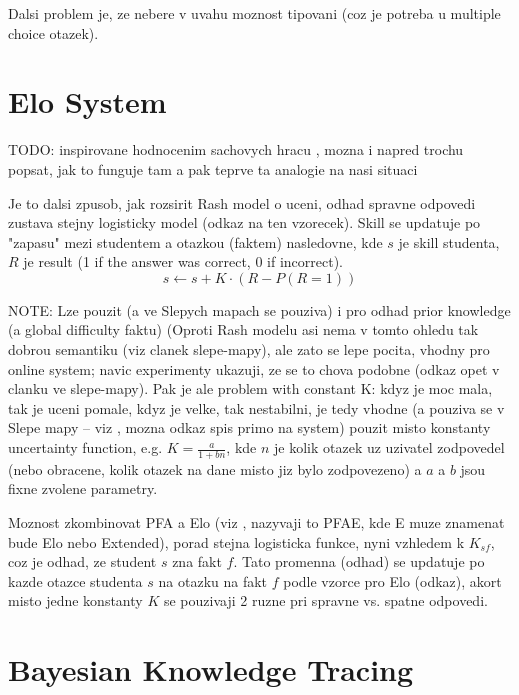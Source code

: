 \documentclass[a4paper, 12pt, twoside]{fithesis2}		%
\renewcommand{\_}{\leavevmode \kern0.0em\vbox{\hrule width0.4em}}
\newcounter{choice}
\begin{document}
Dalsi problem je, ze nebere v uvahu moznost tipovani (coz je potreba u multiple choice otazek).

\section{Elo System}
\label{sec:elo}


TODO: inspirovane hodnocenim sachovych hracu \cite{elo-rating}, mozna i napred trochu popsat, jak to funguje tam a pak teprve ta analogie na nasi situaci

Je to dalsi zpusob, jak rozsirit Rash model o uceni, odhad spravne odpovedi zustava stejny logisticky model (odkaz na ten vzorecek). Skill se updatuje po "zapasu" mezi studentem a otazkou (faktem) nasledovne,
kde $s$ je skill studenta, $R$ je result (1 if the answer was correct, 0 if incorrect).
$$
s \gets s + K \cdot (R - P(R = 1))
$$

NOTE: Lze pouzit (a ve Slepych mapach \cite{slepe-mapy} se pouziva) i pro odhad prior knowledge (a global difficulty faktu)
(Oproti Rash modelu asi nema v tomto ohledu tak dobrou semantiku (viz clanek slepe-mapy), ale zato se lepe pocita, vhodny pro online system; navic experimenty ukazuji, ze se to chova podobne (odkaz opet v clanku ve slepe-mapy).
Pak je ale problem with constant K: kdyz je moc mala, tak je uceni pomale, kdyz je velke, tak nestabilni, je tedy vhodne (a pouziva se v Slepe mapy -- viz \cite{slepe-mapy}, mozna odkaz spis primo na system) pouzit misto konstanty
uncertainty function, e.g. $K = \frac{a}{1 + bn}$, kde $n$ je kolik otazek uz uzivatel zodpovedel (nebo obracene, kolik otazek na dane misto jiz bylo zodpovezeno) a $a$ a $b$ jsou fixne zvolene parametry.

Moznost zkombinovat PFA a Elo (viz \cite{slepe-mapy}, nazyvaji to PFAE, kde E muze znamenat bude Elo nebo Extended), porad stejna logisticka funkce, nyni vzhledem k $K_{sf}$, coz je odhad, ze student $s$ zna fakt $f$. Tato promenna (odhad) se updatuje po kazde otazce studenta $s$ na otazku na fakt $f$ podle vzorce pro Elo (odkaz), akort misto jedne konstanty $K$ se pouzivaji 2 ruzne pri spravne vs. spatne odpovedi.


\section{Bayesian Knowledge Tracing}
\label{sec:bayesian-network}
\end{document}
